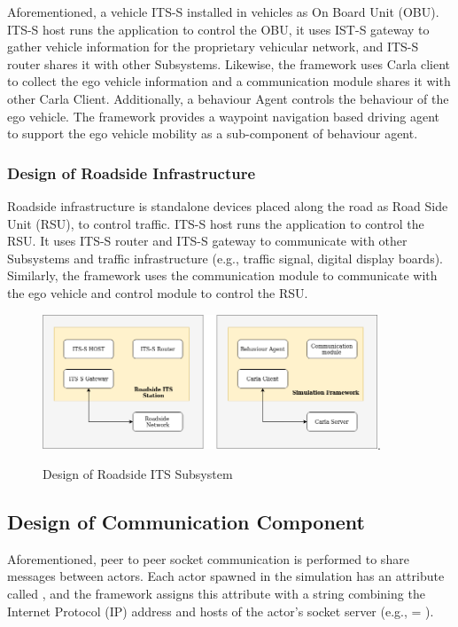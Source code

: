 Aforementioned, a vehicle ITS-S installed in vehicles as On Board Unit (OBU). ITS-S host runs the application to control the OBU, it uses IST-S gateway to gather vehicle information for the proprietary vehicular network, and ITS-S router shares it with other Subsystems. Likewise, the framework uses Carla client to collect the ego vehicle information and a communication module shares it with other Carla Client. Additionally, a behaviour Agent controls the behaviour of the ego vehicle. 
The framework provides a waypoint navigation based driving agent to support the ego vehicle mobility as a sub-component of behaviour agent. 


\subsubsection{Design of Roadside Infrastructure}
Roadside infrastructure is standalone devices placed along the road as Road Side Unit (RSU), to control traffic. ITS-S host runs the application to control the RSU. It uses ITS-S router and ITS-S gateway to communicate with other Subsystems and traffic infrastructure (e.g., traffic signal, digital display boards). Similarly, the framework uses the communication module to communicate with the ego vehicle and control module to control the RSU.

\begin{figure}[h!]
    \centering
    \includegraphics[width=10cm]{Framework/Images/rsuF.png}.
    \caption{Design of Roadside ITS Subsystem}
    \label{rsuF}
\end{figure}


\subsection{Design of Communication Component}
Aforementioned, peer to peer socket communication is performed to share messages between actors. Each actor spawned in the simulation has an attribute called , and the framework assigns this attribute with a string combining the Internet Protocol (IP) address and hosts of the actor's socket server (e.g.,  = ). 

